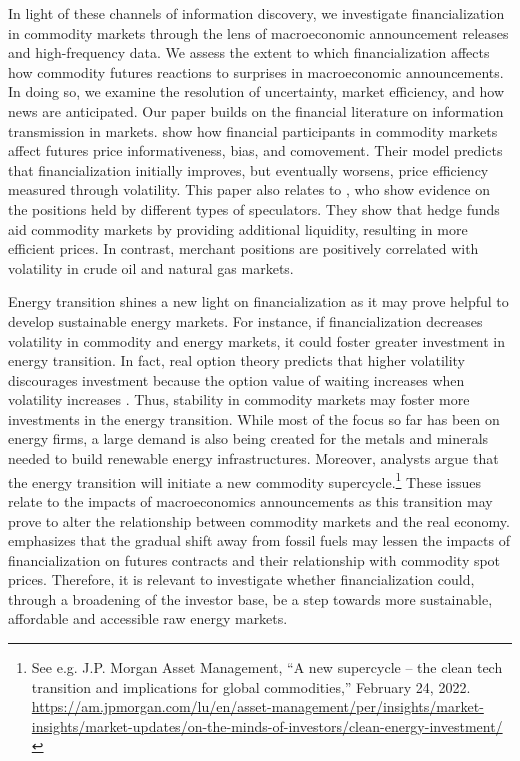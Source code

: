 \documentclass[12pt]{article}
\begin{document}
In light of these channels of information discovery, we investigate financialization in commodity markets through the lens of macroeconomic announcement releases and high-frequency data. We assess the extent to which financialization  affects how commodity futures reactions to surprises in macroeconomic announcements. In doing so, we examine the  resolution of uncertainty, market efficiency, and how news are anticipated. Our paper builds on the financial literature on  information transmission in markets. \citet{goldstein2019commodity} show how financial participants in commodity markets affect futures price informativeness, bias, and comovement. Their model predicts that financialization initially improves, but eventually worsens, price efficiency measured through volatility. This paper also relates to \citet{brunetti2016speculators}, who show evidence on the positions held by different types of speculators. They show that hedge funds aid commodity markets by providing additional liquidity, resulting in more efficient prices. In contrast, merchant positions are positively correlated with volatility in crude oil and natural gas markets. 

Energy transition shines a new light on financialization as it may prove  helpful to develop sustainable energy markets. For instance, if financialization decreases volatility in commodity and energy markets, it could foster greater investment in energy transition. In fact, real option theory predicts that higher volatility discourages investment because the option value of waiting increases when volatility increases \citep{kellogg2014effect}.  Thus,  stability in commodity markets may foster more investments in the  energy  transition. While most of the focus so far has been  on energy firms, a large demand is also being created for the metals and minerals needed to build renewable energy infrastructures. Moreover, analysts argue that the energy transition will initiate a new commodity supercycle.\footnote{See e.g. J.P. Morgan Asset Management, ``A new supercycle – the clean tech transition and implications for global commodities,'' February 24, 2022. \url{https://am.jpmorgan.com/lu/en/asset-management/per/insights/market-insights/market-updates/on-the-minds-of-investors/clean-energy-investment/}}  These issues relate to the impacts of macroeconomics announcements as this transition may prove to alter the relationship between commodity markets and the real economy. \citet{knuth2018breakthroughs} emphasizes that the gradual shift away from fossil fuels may lessen the impacts of financialization on futures contracts and their relationship with commodity spot prices. Therefore, it is relevant to investigate whether financialization could, through a broadening of the investor base, be a step towards more sustainable, affordable and accessible raw energy markets.
\end{document}
